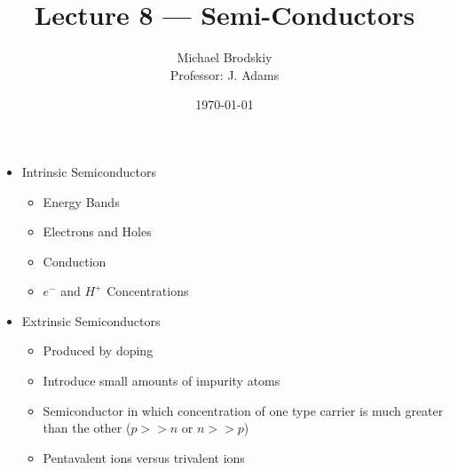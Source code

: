 


\title{Lecture 8 — Semi-Conductors}
\date{\today}
\author{Michael Brodskiy\\ \small Professor: J. Adams}



\maketitle

\begin{itemize}

  \item Intrinsic Semiconductors

    \begin{itemize}

      \item Energy Bands

      \item Electrons and Holes

      \item Conduction

      \item $e^-$ and $H^+$ Concentrations

    \end{itemize}

  \item Extrinsic Semiconductors

    \begin{itemize}

      \item Produced by doping

      \item Introduce small amounts of impurity atoms

      \item Semiconductor in which concentration of one type carrier is much greater than the other ($p>>n$ or $n>>p$)

      \item Pentavalent ions versus trivalent ions

    \end{itemize}

\end{itemize}



